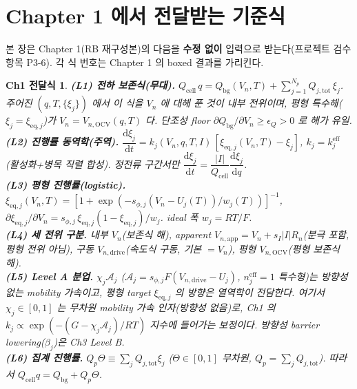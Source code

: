 \documentclass[11pt,a4paper]{article}
\newtheorem*{linkbox}{Ch1 전달식}
\newcommand{\dd}{\mathrm{d}}
\newcommand{\eff}{\mathrm{eff}}
\newcommand{\eq}{\mathrm{eq}}
\newcommand{\app}{\mathrm{app}}
\newcommand{\drive}{\mathrm{drive}}
\newcommand{\bg}{\mathrm{bg}}
\newcommand{\cell}{\mathrm{cell}}
\newcommand{\OCV}{\mathrm{OCV}}
\newcommand{\tot}{\mathrm{tot}}
\begin{document}
\section{Chapter 1 에서 전달받는 기준식}\label{sec:ch2_inherit}
본 장은 Chapter 1(RB 재구성본)의 다음을 \textbf{수정 없이} 입력으로 받는다(프로젝트 검수 항목 P3-6). 각 식 번호는
Chapter 1 의 boxed 결과를 가리킨다.
\begin{linkbox}
\textbf{(L1) 전하 보존식(무대).} $Q_\cell\,q=Q_\bg(V_n,T)+\sum_{j=1}^{N_p}Q_{j,\tot}\,\xi_j$. 주어진
$(q,T,\{\xi_j\})$ 에서 이 식을 $V_n$ 에 대해 푼 것이 내부 전위이며, 평형 특수해($\xi_j=\xi_{\eq,j}$)가
$V_n=V_{n,\OCV}(q,T)$ 다. 단조성 floor $\partial Q_\bg/\partial V_n\ge\epsilon_Q>0$ 로 해가 유일.\\
\textbf{(L2) 진행률 동역학(주역).} $\dfrac{\dd\xi_j}{\dd t}=k_j(V_n,q,T,I)\,[\xi_{\eq,j}(V_n,T)-\xi_j]$,
$k_j=k_j^{\eff}$(활성화+병목 직렬 합성). 정전류 구간서만 $\dfrac{\dd\xi_j}{\dd t}=\dfrac{|I|}{Q_\cell}\dfrac{\dd\xi_j}{\dd q}$.\\
\textbf{(L3) 평형 진행률(logistic).} $\xi_{\eq,j}(V_n,T)=[1+\exp(-s_{\phi,j}(V_n-U_j(T))/w_j(T))]^{-1}$,
$\partial\xi_{\eq,j}/\partial V_n=s_{\phi,j}\,\xi_{\eq,j}(1-\xi_{\eq,j})/w_j$. ideal 폭 $w_j=RT/F$.\\
\textbf{(L4) 세 전위 구분.} 내부 $V_n$(보존식 해), apparent $V_{n,\app}=V_n+s_I|I|R_n$(분극 포함, 평형
전위 아님), 구동 $V_{n,\drive}$(속도식 구동, 기본 $=V_n$), 평형 $V_{n,\OCV}$(평형 보존식 해).\\
\textbf{(L5) Level A 분업.} $\chi_j\mathcal A_j$ ($\mathcal A_j=s_{\phi,j}F(V_{n,\drive}-U_j)$, $n_j^{\eff}=1$
특수형)는 \emph{방향성 없는} mobility 가속이고, 평형 target $\xi_{\eq,j}$ 의 방향은 열역학이 전담한다.
여기서 $\chi_j\in[0,1]$ 는 무차원 mobility 가속 인자(방향성 없음)로, Ch1 의 $k_j\propto\exp(-(G-\chi_j\mathcal A_j)/RT)$
지수에 들어가는 보정이다. 방향성 barrier lowering($\beta_j$)은 Ch3 Level B.\\
\textbf{(L6) 집계 진행률.} $Q_p\Theta\equiv\sum_jQ_{j,\tot}\xi_j$ ($\Theta\in[0,1]$ 무차원,
$Q_p=\sum_jQ_{j,\tot}$). 따라서 $Q_\cell q=Q_\bg+Q_p\Theta$.
\end{linkbox}
\end{document}
